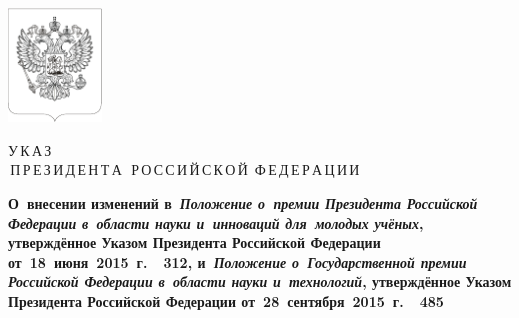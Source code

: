 \documentclass[12pt, a4paper]{extarticle}
\begin{document}
\begin{center}
	\thispagestyle{empty}

	\setBold[.5]
	
	\vspace*{-1cm}
	\includegraphics[width=2.5cm]{./emblem_black_bordered} \medskip
	
	\huge{У}\Large{\,К\,А\,З} \\\medskip
	\Large{\,П}\normalsize \,Р\,Е\,З\,И\,Д\,Е\,Н\,Т\,А\, 
	\Large{\,Р}\normalsize \,О\,С\,С\,И\,Й\,С\,К\,О\,Й 
	\Large{\,Ф}\normalsize \,Е\,Д\,Е\,Р\,А\,Ц\,И\,И 
	\bigskip
	\unsetBold
	
	\begin{minipage}{.95\textwidth}
		\bfseries
		\centering\normalsize
		О~внесении изменений в~\emph{Положение о~премии Президента Российской Федерации в~области науки и~инноваций для~молодых учёных}, утверждённое Указом Президента Российской Федерации от~18~июня~2015~г.~\textnumero~312, и~\emph{Положение о~Государственной премии Российской Федерации в~области науки и~технологий}, утверждённое Указом Президента Российской Федерации от~28~сентября~2015~г.~\textnumero~485
		\unsetBold
	\end{minipage}
	\bigskip
	
\end{center}
\end{document}
